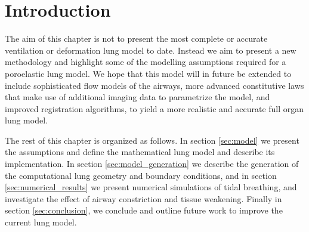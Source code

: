 \section{Introduction}
The aim of this chapter is not to present the most complete or accurate ventilation or deformation lung model to date. Instead we aim to present a new methodology and highlight some of the modelling assumptions required for a poroelastic lung model. We hope that this model will in future be extended to include sophisticated flow models of the airways, more advanced constitutive laws that make use of additional imaging data to parametrize the model, and improved registration algorithms, to yield a more realistic and accurate full organ lung model.

The rest of this chapter is organized as follows. In section \ref{sec:model} we present the assumptions and define the mathematical lung model and describe its implementation. In section \ref{sec:model_generation} we describe the generation of the computational lung geometry and boundary conditions, and in section \ref{sec:numerical_results} we present numerical simulations of tidal breathing, and investigate the effect of airway constriction and tissue weakening. Finally in section \ref{sec:conclusion}, we conclude and outline future work to improve the current lung model.
